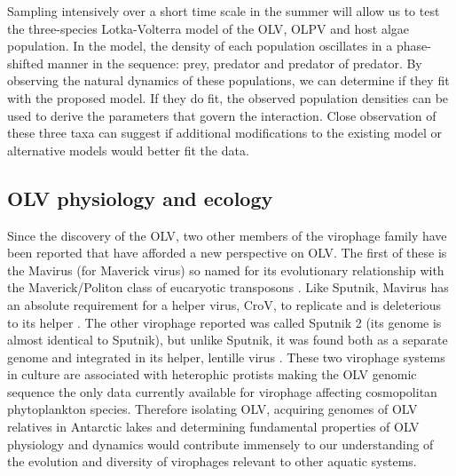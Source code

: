 Sampling intensively over a short time scale in the summer will allow us to test the three-species Lotka-Volterra model of the \ac{OLV}, \ac{OLPV} and host algae population.
In the model, the density of each population oscillates in a phase-shifted manner in the sequence: prey, predator and predator of predator.
By observing the natural dynamics of these populations, we can determine if they fit with the proposed model.
If they do fit, the observed population densities can be used to derive the parameters that govern the interaction.
Close observation of these three taxa can suggest if additional modifications to the existing model or alternative models would better fit the data.

\subsection{\acs{OLV} physiology and ecology}
Since the discovery of the \ac{OLV}, two other members of the virophage family have been reported that have afforded a new perspective on \ac{OLV}.
The first of these is the Mavirus (for Maverick virus) so named for its evolutionary relationship with the Maverick/Politon class of eucaryotic transposons \cite{Fischer2011a}.
Like Sputnik, Mavirus has an absolute requirement for a helper virus, \ac{CroV}, to replicate and is deleterious to its helper \cite{Fischer2011a}.
The other virophage reported was called Sputnik 2 (its genome is almost identical to Sputnik), but unlike Sputnik, it was found both as a separate genome and integrated in its helper, lentille virus \cite{Desnues2012}.
These two virophage systems in culture are associated with heterophic protists making the \ac{OLV} genomic sequence the only data currently available for virophage affecting cosmopolitan phytoplankton species.
Therefore isolating \ac{OLV}, acquiring genomes of \ac{OLV} relatives in Antarctic lakes and determining fundamental properties of \ac{OLV} physiology and dynamics would contribute immensely to our understanding of the evolution and diversity of virophages relevant to other aquatic systems.

